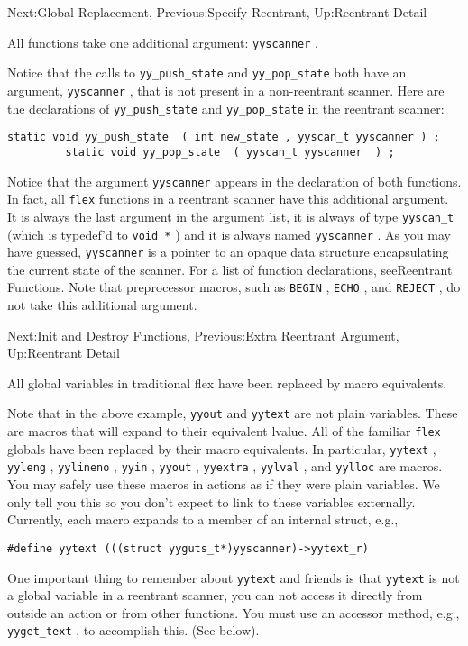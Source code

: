 \documentclass[openany,oneside]{book}
\begin{document}
Next:Global Replacement,
Previous:Specify Reentrant,
Up:Reentrant Detail

All functions take one additional argument: \verb`yyscanner` .

Notice that the calls to \verb`yy_push_state` and \verb`yy_pop_state` both have an argument, \verb`yyscanner` , that is not present in a
non-reentrant scanner.  Here are the declarations of \verb`yy_push_state` and \verb`yy_pop_state` in the reentrant scanner:
\begin{verbatim}
static void yy_push_state  ( int new_state , yyscan_t yyscanner ) ;
         static void yy_pop_state  ( yyscan_t yyscanner  ) ;
\end{verbatim}


Notice that the argument \verb`yyscanner` appears in the declaration of
both functions.  In fact, all \verb`flex` functions in a reentrant
scanner have this additional argument.  It is always the last argument
in the argument list, it is always of type \verb`yyscan_t` (which is
typedef'd to \verb`void *` ) and it is
always named \verb`yyscanner` .  As you may have guessed, \verb`yyscanner` is a pointer to an opaque data structure encapsulating
the current state of the scanner.  For a list of function declarations,
seeReentrant Functions. Note that preprocessor macros, such as \verb`BEGIN` , \verb`ECHO` , and \verb`REJECT` , do not take this
additional argument.


Next:Init and Destroy Functions,
Previous:Extra Reentrant Argument,
Up:Reentrant Detail

All global variables in traditional flex have been replaced by macro equivalents.

Note that in the above example, \verb`yyout` and \verb`yytext` are
not plain variables. These are macros that will expand to their equivalent lvalue. 
All of the familiar \verb`flex` globals have been replaced by their macro
equivalents. In particular, \verb`yytext` , \verb`yyleng` , \verb`yylineno` , \verb`yyin` , \verb`yyout` , \verb`yyextra` , \verb`yylval` , and \verb`yylloc` are macros. You may safely use these macros in actions as if they were plain
variables. We only tell you this so you don't expect to link to these variables
externally. Currently, each macro expands to a member of an internal struct, e.g.,
\begin{verbatim}
#define yytext (((struct yyguts_t*)yyscanner)->yytext_r)
\end{verbatim}


One important thing to remember about \verb`yytext` and friends is that \verb`yytext` is not a global variable in a reentrant
scanner, you can not access it directly from outside an action or from
other functions. You must use an accessor method, e.g., \verb`yyget_text` ,
to accomplish this. (See below).
\end{document}
